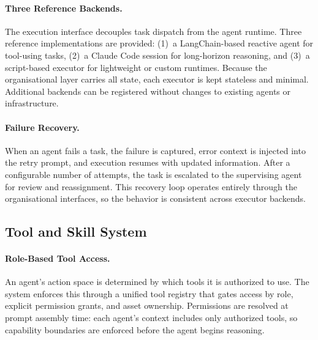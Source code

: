 \paragraph{Three Reference Backends.}
The execution interface decouples task dispatch from the agent runtime. Three reference implementations are provided: (1)~a LangChain-based reactive agent for tool-using tasks, (2)~a Claude Code session for long-horizon reasoning, and (3)~a script-based executor for lightweight or custom runtimes. Because the organisational layer carries all state, each executor is kept stateless and minimal. Additional backends can be registered without changes to existing agents or infrastructure.

\paragraph{Failure Recovery.}
When an agent fails a task, the failure is captured, error context is injected into the retry prompt, and execution resumes with updated information. After a configurable number of attempts, the task is escalated to the supervising agent for review and reassignment. This recovery loop operates entirely through the organisational interfaces, so the behavior is consistent across executor backends.

\subsection{Tool and Skill System}
\label{sec:tools}

\paragraph{Role-Based Tool Access.}
An agent's action space is determined by which tools it is authorized to use. The system enforces this through a unified tool registry that gates access by role, explicit permission grants, and asset ownership. Permissions are resolved at prompt assembly time: each agent's context includes only authorized tools, so capability boundaries are enforced before the agent begins reasoning.


